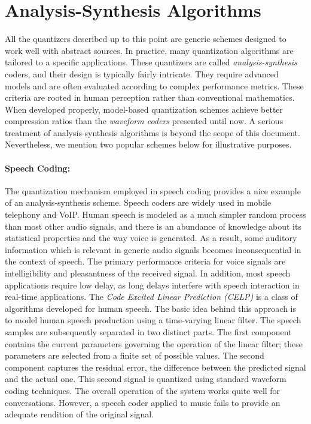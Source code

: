 \section{Analysis-Synthesis Algorithms}

All the quantizers described up to this point are generic schemes designed to work well with abstract sources.
In practice, many quantization algorithms are tailored to a specific applications.
These quantizers are called \emph{analysis-synthesis} coders, and their design is typically fairly intricate.
They require advanced models and are often evaluated according to complex performance metrics.
These criteria are rooted in human perception rather than conventional mathematics.
When developed properly, model-based quantization schemes achieve better compression ratios than the \emph{waveform coders} presented until now.
A serious treatment of analysis-synthesis algorithms is beyond the scope of this document.
Nevertheless, we mention two popular schemes below for illustrative purposes.

\paragraph{Speech Coding:}
The quantization mechanism employed in speech coding provides a nice example of an analysis-synthesis scheme.
Speech coders are widely used in mobile telephony and VoIP.
Human speech is modeled as a much simpler random process than most other audio signals, and there is an abundance of knowledge about its statistical properties and the way voice is generated.
As a result, some auditory information which is relevant in generic audio signals becomes inconsequential in the context of speech.
The primary performance criteria for voice signals are intelligibility and pleasantness of the received signal.
In addition, most speech applications require low delay, as long delays interfere with speech interaction in real-time applications.
The \emph{Code Excited Linear Prediction (CELP)} is a class of algorithms developed for human speech.
The basic idea behind this approach is to model human speech production using a time-varying linear filter.
The speech samples are subsequently separated in two distinct parts.
The first component contains the current parameters governing the operation of the linear filter; these parameters are selected from a finite set of possible values.
The second component captures the residual error, the difference between the predicted signal and the actual one.
This second signal is quantized using standard waveform coding techniques.
The overall operation of the system works quite well for conversations.
However, a speech coder applied to music fails to provide an adequate rendition of the original signal.

